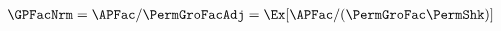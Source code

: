   \begin{align}
    \GPFacNrm  & = \APFac/\PermGroFacAdj = \Ex[\APFac/(\PermGroFac\PermShk)]  \label{eq:GPFNrm}
  \end{align}
